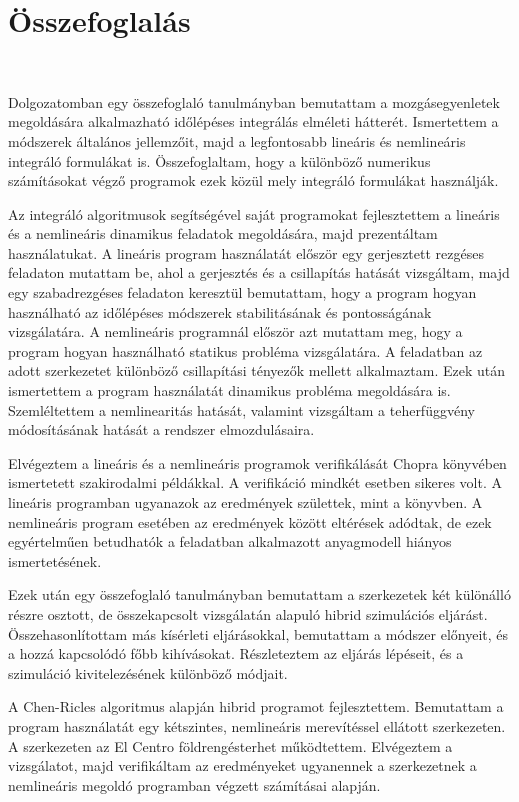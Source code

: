 \chapter{Összefoglalás}

{\ }

Dolgozatomban egy összefoglaló tanulmányban bemutattam a mozgásegyenletek megoldására alkalmazható időlépéses integrálás elméleti hátterét. Ismertettem a módszerek általános jellemzőit, majd a legfontosabb lineáris és nemlineáris integráló formulákat is. Összefoglaltam, hogy a különböző numerikus számításokat végző programok ezek közül mely integráló formulákat használják.

Az integráló algoritmusok  segítségével saját programokat fejlesztettem a lineáris és a nemlineáris dinamikus  feladatok megoldására, majd prezentáltam használatukat. A lineáris program használatát először egy gerjesztett rezgéses feladaton mutattam be, ahol a gerjesztés és a csillapítás hatását vizsgáltam, majd egy szabadrezgéses feladaton keresztül bemutattam, hogy a program hogyan használható az időlépéses módszerek stabilitásának és pontosságának vizsgálatára. A nemlineáris programnál először azt mutattam meg, hogy a program hogyan használható statikus  probléma vizsgálatára.  A feladatban az adott szerkezetet különböző csillapítási   tényezők  mellett alkalmaztam. Ezek után ismertettem a program használatát dinamikus probléma megoldására is. Szemléltettem a nemlinearitás hatását, valamint vizsgáltam a teherfüggvény módosításának hatását a rendszer elmozdulásaira.

Elvégeztem a lineáris és a nemlineáris programok verifikálását   Chopra  könyvében \cite{chopra} ismertetett szakirodalmi példákkal. A verifikáció mindkét esetben sikeres volt. A lineáris programban ugyanazok az eredmények születtek, mint a könyvben. A nemlineáris program esetében az eredmények között eltérések adódtak, de ezek egyértelműen betudhatók a feladatban alkalmazott anyagmodell hiányos ismertetésének.

Ezek után egy összefoglaló tanulmányban bemutattam a szerkezetek két különálló részre osztott, de összekapcsolt vizsgálatán alapuló  hibrid szimulációs eljárást. Összehasonlítottam más kísérleti eljárásokkal, bemutattam a módszer előnyeit, és a hozzá kapcsolódó főbb kihívásokat. Részleteztem az eljárás  lépéseit, és a szimuláció kivitelezésének különböző módjait.

A Chen-Ricles algoritmus alapján  hibrid programot fejlesztettem. Bemutattam a program használatát egy kétszintes,  nemlineáris merevítéssel ellátott szerkezeten. A szerkezeten az El Centro földrengésterhet működtettem. Elvégeztem a vizsgálatot, majd verifikáltam az eredményeket ugyanennek a szerkezetnek a nemlineáris megoldó programban végzett számításai alapján.


